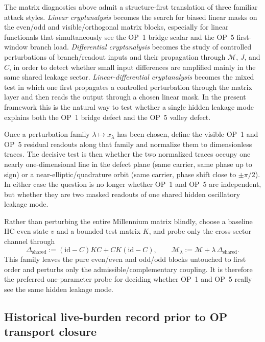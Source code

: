 \begin{description}[leftmargin=2.2em, labelindent=0pt, itemsep=0.5em]
  \item[Cryptanalytic translation tool.] The matrix diagnostics above admit a structure-first translation of three familiar attack styles. \emph{Linear cryptanalysis} becomes the search for biased linear masks on the even/odd and visible/orthogonal matrix blocks, especially for linear functionals that simultaneously see the OP~1 bridge scalar and the OP~5 first-window branch load. \emph{Differential cryptanalysis} becomes the study of controlled perturbations of branch/readout inputs and their propagation through \(\mathcal M\), \(J\), and \(C\), in order to detect whether small input differences are amplified mainly in the same shared leakage sector. \emph{Linear-differential cryptanalysis} becomes the mixed test in which one first propagates a controlled perturbation through the matrix layer and then reads the output through a chosen linear mask. In the present framework this is the natural way to test whether a single hidden leakage mode explains both the OP~1 bridge defect and the OP~5 valley defect.
  \item[Shared phase-coupling tool.] Once a perturbation family \(\lambda\mapsto x_\lambda\) has been chosen, define the visible OP~1 and OP~5 residual readouts along that family and normalize them to dimensionless traces. The decisive test is then whether the two normalized traces occupy one nearly one-dimensional line in the defect plane (same carrier, same phase up to sign) or a near-elliptic/quadrature orbit (same carrier, phase shift close to \(\pm\pi/2\)). In either case the question is no longer whether OP~1 and OP~5 are independent, but whether they are two masked readouts of one shared hidden oscillatory leakage mode.
  \item[Shared leakage probe-family tool.] Rather than perturbing the entire Millennium matrix blindly, choose a baseline HC-even state \(v\) and a bounded test matrix \(K\), and probe only the cross-sector channel through
  \[
    \Delta_{\mathrm{shared}}:= (\mathrm{id}-C)KC + CK(\mathrm{id}-C),
    \qquad
    \mathcal M_\lambda := \mathcal M + \lambda\,\Delta_{\mathrm{shared}}.
  \]
  This family leaves the pure even/even and odd/odd blocks untouched to first order and perturbs only the admissible/complementary coupling. It is therefore the preferred one-parameter probe for deciding whether OP~1 and OP~5 really see the same hidden leakage mode.
\end{description}

\subsection*{Historical live-burden record prior to OP transport closure}
